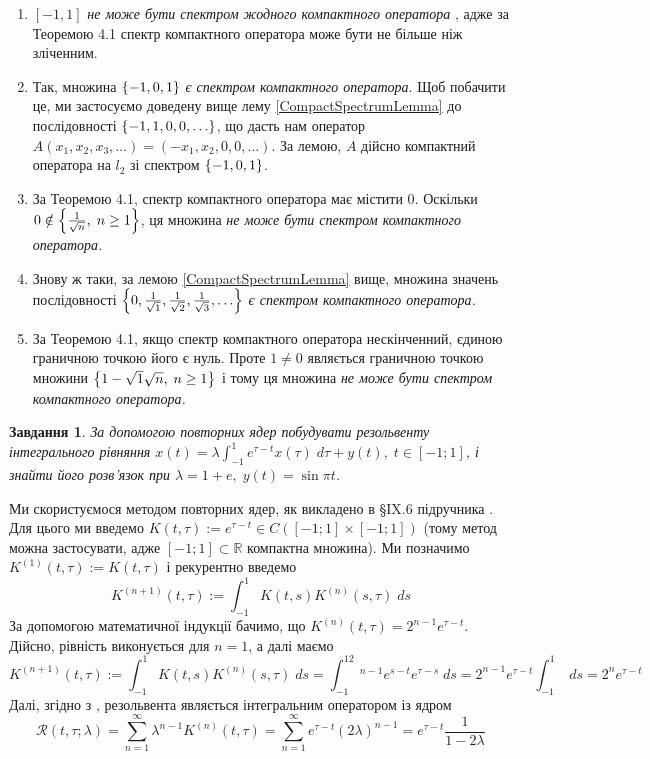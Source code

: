 \documentclass[12pt]{article} %
\newtheorem{prob}{Завдання}
\newcommand{\ds}{\;ds}
\begin{document}
\begin{enumerate}
	\renewcommand{\labelenumi}{\myralph{enumi})}
\item{$[-1,1]$ {\it не може бути спектром жодного компактного оператора}
	, адже за Теоремою 4.1 спектр компактного оператора може бути не більше ніж зліченним.}
	\item{Так, множина $\left\{-1,0,1\right\}$ {\it є спектром компактного оператора}. Щоб побачити це, ми застосуємо доведену вище лему
		\ref{CompactSpectrumLemma} до
		послідовності $\left\{-1,1,0,0,\hdots\right\}$, що дасть нам оператор $A(x_1,x_2,x_3,\hdots)=(-x_1,x_2,0,0,\hdots)$. За лемою, $A$
		дійсно компактний оператора на $l_2$ зі спектром $\left\{-1,0,1\right\}$.}
	\item{За Теоремою 4.1, спектр компактного оператора має містити 0. Оскільки $0\notin\left\{\frac{1}{\sqrt{n}},\;n\geq 1\right\}$, ця множина
		{\it не може бути спектром компактного оператора.}}
	\item{Знову ж таки, за лемою \ref{CompactSpectrumLemma} вище, множина значень послідовності
		$\left\{0,\frac{1}{\sqrt{1}},\frac{1}{\sqrt{2}},\frac{1}{\sqrt{3}},\hdots\right\}$ {\it є спектром компактного оператора.}}
	\item{За Теоремою 4.1, якщо спектр компактного оператора нескінченний, єдиною граничною точкою його є нуль. Проте $1\neq 0$ являється
		граничною точкою множини $\left\{1-\sqrt{1}{\sqrt{n}},\;n\geq 1\right\}$ і тому ця множина {\it 
		не може бути спектром компактного оператора.}}
\end{enumerate}
\begin{prob}За допомогою повторних ядер побудувати резольвенту інтегрального рівняння $x(t)=\lambda
	\displaystyle\int_{-1}^{1}e^{\tau-t}x(\tau)\;d\tau+
	y(t),\;t\in[-1;1]$, і знайти його розв’язок при $\lambda=1+e,\;y(t)=\sin\pi t$.\end{prob}
	Ми скористуємося методом повторних ядер, як викладено в \S IX.6 підручника
	\cite{tb}. Для цього ми введемо $K(t,\tau):=e^{\tau-t}\in
	C([-1;1]\times[-1;1])$ (тому метод можна застосувати, адже $[-1;1]\subset\mathbb{R}$
	компактна множина). Ми позначимо $K^{(1)}(t,
	\tau):=K(t,\tau)$ і рекурентно введемо
	\[K^{(n+1)}(t,\tau):=\int_{-1}^1 K(t,s)K^{(n)}(s,\tau)\ds\]
	За допомогою математичної індукції бачимо, що $K^{(n)}(t,\tau)=2^{n-1}e^{\tau-t}$. Дійсно, рівність виконується для
	$n=1$, а далі маємо
	\[K^{(n+1)}(t,\tau):=\int
	_{-1}^1 K(t,s)K^{(n)}(s,\tau)\ds=\int_{-1}^12^{n-1}e^{s-t}e^{\tau-s}\ds=2^{n-1}e^{\tau-t}\int_{-1}^1\ds=2^ne^{\tau-t}\]
	Далі, згідно з \cite{tb}, резольвента являється інтегральним оператором із ядром
	\[\mathcal{R}(t,\tau;\lambda)=\sum_{n=1}^\infty \lambda^{n-1}K^{(n)}(t,\tau)=\sum_{n=1}^\infty e^{\tau-t}(2\lambda)^{n-1}
	=e^{\tau-t}\frac{1}{1-2\lambda}\]
\end{document}
